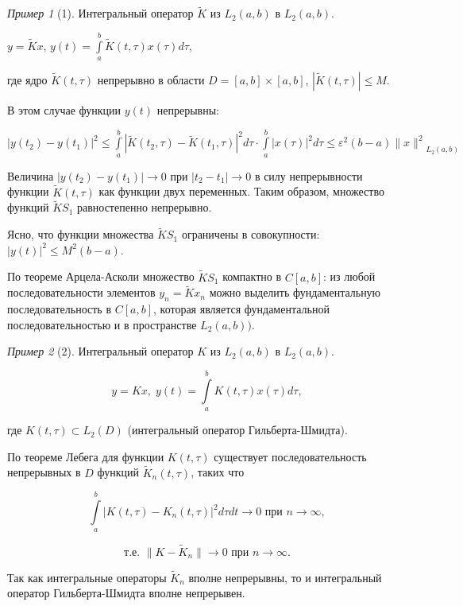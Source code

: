 \documentclass[12pt,a4paper,titlepage,oneside]{book}
\theoremstyle{definition}
\theoremstyle{plain}
\theoremstyle{break}
\theoremstyle{remark}
\theoremstyle{remark}
\newtheorem*{example}{Пример}
\theoremstyle{remark}
\theoremstyle{remark}
\theoremstyle{plain}
\theoremstyle{plain}
\begin{document}
\begin{example}[1]
Интегральный оператор $\widetilde{K}$ из $L_2(a,b)$ в $L_2(a,b)$.

\begin{center}
$y=\widetilde{K}x$, $y(t)=\displaystyle\int\limits_a^b \widetilde{K}(t, \tau)x(\tau)d\tau$,
\end{center}

где ядро $\widetilde{K}(t, \tau)$ непрерывно в области $D=[a,b]\times[a,b]$, $|\widetilde{K}(t, \tau)|\leqslant M$.

В этом случае функции $y(t)$ непрерывны:

\begin{center}
$|y(t_2)-y(t_1)|^2\leq \displaystyle\int\limits_a^b |\widetilde{K}(t_2, \tau)-\widetilde{K}(t_1, \tau)|^2d\tau \cdot \displaystyle\int\limits_a^b |x(\tau)|^2 d\tau \leqslant \varepsilon^2 (b-a){\lVert x\rVert^2}_{L_2(a,b)}$
\end{center}

Величина $|y(t_2)-y(t_1)|\to 0$ при $|t_2-t_1|\to 0$ в силу непрерывности функции $\widetilde{K}(t, \tau)$ как функции двух переменных. Таким образом, множество функций $\widetilde{K} S_1$ равностепенно непрерывно.

Ясно, что функции множества $\widetilde{K} S_1$ ограничены в совокупности: $|y(t)|^2 \leqslant M^2 (b-a)$.

По теореме Арцела-Асколи множество $\widetilde{K} S_1$ компактно в $C[a,b]$: из любой последовательности элементов $y_n=\widetilde{K} x_n$ можно выделить фундаментальную последовательность в $C[a,b]$, которая является фундаментальной последовательностью и в пространстве $L_2 (a,b))$.
\end{example}

\begin{example}[2]
Интегральный оператор $K$ из $L_2(a,b)$ в $L_2(a,b)$.

$$y=Kx, \; y(t) = \displaystyle\int\limits_a^b K(t, \tau)x(\tau)d\tau,$$

где $K(t, \tau)\subset L_2(D)$ (интегральный оператор Гильберта-Шмидта).

По теореме Лебега для функции $K(t, \tau)$ существует последовательность непрерывных в $D$ функций $\widetilde{K}_n (t, \tau)$, таких что

$$\displaystyle\int\limits_a^b |K(t, \tau) - K_n(t, \tau)|^2d\tau dt \to 0 \mbox{ при } n\to \infty,$$

$$\mbox{т.е. } \lVert K-\widetilde{K}_n \rVert \to 0 \mbox{ при } n\to \infty.$$

Так как интегральные операторы $\widetilde{K}_n$ вполне непрерывны, то и интегральный оператор Гильберта-Шмидта вполне непрерывен.
\end{example}
\end{document}
